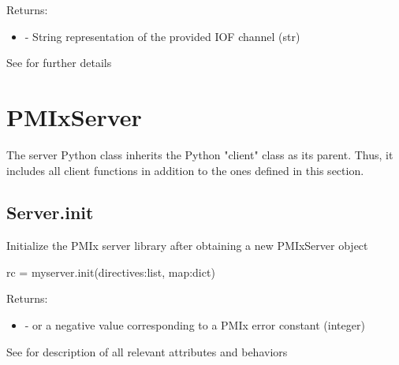 \begin{arglist}
\end{arglist}

Returns:
\begin{itemize}
    \item {} - String representation of the provided IOF channel (str)
\end{itemize}

See  for further details



\section{PMIxServer}
\label{app:python:server}

The server Python class inherits the Python "client" class as its parent. Thus, it includes all client functions in addition to the ones defined in this section.

\subsection{Server.init}

\summary Initialize the \ac{PMIx} server library after obtaining a new PMIxServer object

\format

\pyspecificstart
\begin{codepar}
rc = myserver.init(directives:list, map:dict)
\end{codepar}
\pyspecificend


\begin{arglist}
\end{arglist}

Returns:

\begin{itemize}
    \item {} -  or a negative value corresponding to a PMIx error constant (integer)
\end{itemize}


See  for description of all relevant attributes and behaviors


